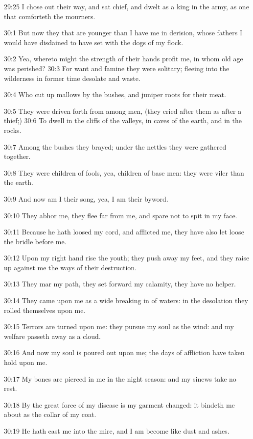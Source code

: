 29:25 I chose out their way, and sat chief, and dwelt as a king in the
army, as one that comforteth the mourners.

30:1 But now they that are younger than I have me in derision, whose
fathers I would have disdained to have set with the dogs of my flock.

30:2 Yea, whereto might the strength of their hands profit me, in whom
old age was perished?  30:3 For want and famine they were solitary;
fleeing into the wilderness in former time desolate and waste.

30:4 Who cut up mallows by the bushes, and juniper roots for their
meat.

30:5 They were driven forth from among men, (they cried after them as
after a thief;) 30:6 To dwell in the cliffs of the valleys, in caves
of the earth, and in the rocks.

30:7 Among the bushes they brayed; under the nettles they were
gathered together.

30:8 They were children of fools, yea, children of base men: they were
viler than the earth.

30:9 And now am I their song, yea, I am their byword.

30:10 They abhor me, they flee far from me, and spare not to spit in
my face.

30:11 Because he hath loosed my cord, and afflicted me, they have also
let loose the bridle before me.

30:12 Upon my right hand rise the youth; they push away my feet, and
they raise up against me the ways of their destruction.

30:13 They mar my path, they set forward my calamity, they have no
helper.

30:14 They came upon me as a wide breaking in of waters: in the
desolation they rolled themselves upon me.

30:15 Terrors are turned upon me: they pursue my soul as the wind: and
my welfare passeth away as a cloud.

30:16 And now my soul is poured out upon me; the days of affliction
have taken hold upon me.

30:17 My bones are pierced in me in the night season: and my sinews
take no rest.

30:18 By the great force of my disease is my garment changed: it
bindeth me about as the collar of my coat.

30:19 He hath cast me into the mire, and I am become like dust and
ashes.

